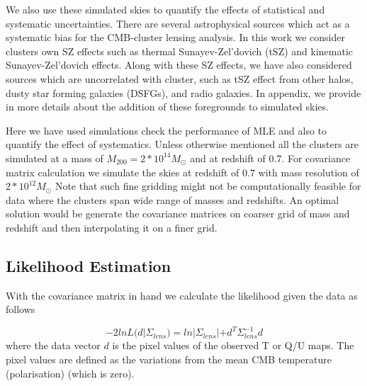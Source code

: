  We also use these simulated skies to quantify the effects of statistical and systematic uncertainties.
 There are several astrophysical sources which act as a systematic bias for the CMB-cluster lensing analysis. 
 In this work we consider clusters own SZ effects such as thermal Sunayev-Zel'dovich (tSZ) and kinematic Sunayev-Zel'dovich effects. 
 Along with these SZ effects, we have also considered sources which are uncorrelated with cluster, such as tSZ effect from other halos, dusty star forming galaxies (DSFGs), and radio galaxies.
 In appendix, we provide in more details about the addition of these foregrounds to simulated skies.
 
Here we have used simulations check the performance of MLE and also to quantify the effect of systematics. 
 Unless otherwise mentioned all the clusters are simulated at a mass of $M_{200} = 2*10^{14} M_{\odot}$ %
 and at redshift of 0.7.
 For covariance matrix calculation we simulate the skies at redshift of $0.7$ with mass resolution of $2*10^{12} M_{\odot}$
 Note that such fine gridding might not be computationally feasible for data where the clusters span wide range of masses and redshifts.
 An optimal solution would be generate the covariance matrices on coarser grid of mass and redshift and then interpolating it on a finer grid.

   
  
  \subsection{Likelihood Estimation}
  With the covariance matrix in hand we calculate the likelihood given the data as follows 
  
  \begin{equation}
  -2lnL(d|\Sigma_{lens}) = ln |\Sigma_{lens}| + d^{T} \Sigma^{-1}_{lens} d
  \end{equation}
  where the data vector $d$ is the pixel values of the observed T or Q/U maps.
  The pixel values are defined as the variations from the mean CMB temperature (polarisation) (which is zero).
  
